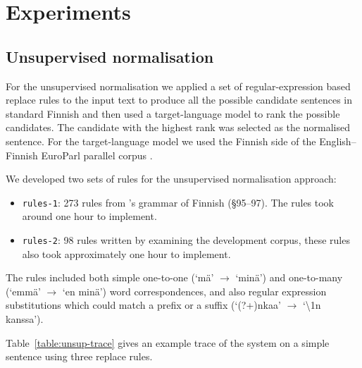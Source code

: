 \documentclass[11pt]{article}
\begin{document}
\section{Experiments}

\subsection{Unsupervised normalisation}

For the unsupervised normalisation we applied a set of regular-expression based 
replace rules to the input text to produce all the possible candidate sentences 
in standard Finnish and then used a target-language model to rank the possible 
candidates. The candidate with the highest rank was selected as the normalised sentence.
For the target-language model we used the Finnish side of the English--Finnish EuroParl
parallel corpus \cite{koehn2005}.

We developed two sets of rules for the unsupervised normalisation approach:

\begin{itemize}
  \item \texttt{rules-1}: 273 rules from 's grammar of Finnish (\S95--97). The 
    rules took around one hour to implement.
  \item \texttt{rules-2}: 98 rules written by examining the development corpus, these rules also
    took approximately one hour to implement.
\end{itemize}

The rules included both simple one-to-one (`m\"{a}' $\rightarrow$ `min\"{a}') and one-to-many (`emm\"{a}' $\rightarrow$ `en min\"{a}') word correspondences,
and also regular expression substitutions which could match a prefix or a suffix (`(?+)nkaa' $\rightarrow$ `\textbackslash1n kanssa').

Table~\ref{table:unsup-trace} gives an example trace of the system on a simple sentence
using three replace rules.
\end{document}
